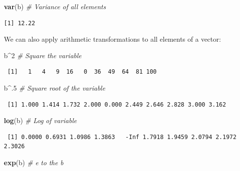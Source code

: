 \documentclass[12pt,]{book}
\newenvironment{Shaded}{\begin{snugshade}}{\end{snugshade}}
\newcommand{\CommentTok}[1]{\textcolor[rgb]{0.56,0.35,0.01}{\textit{#1}}}
\newcommand{\DecValTok}[1]{\textcolor[rgb]{0.00,0.00,0.81}{#1}}
\newcommand{\KeywordTok}[1]{\textcolor[rgb]{0.13,0.29,0.53}{\textbf{#1}}}
\newcommand{\NormalTok}[1]{#1}
\newcommand{\OperatorTok}[1]{\textcolor[rgb]{0.81,0.36,0.00}{\textbf{#1}}}
\begin{document}
\begin{Shaded}
\begin{Highlighting}[]
\KeywordTok{var}\NormalTok{(b)      }\CommentTok{# Variance of all elements}
\end{Highlighting}
\end{Shaded}

\begin{verbatim}
[1] 12.22
\end{verbatim}

We can also apply arithmetic transformations to all elements of a vector:

\begin{Shaded}
\begin{Highlighting}[]
\NormalTok{b}\OperatorTok{^}\DecValTok{2}               \CommentTok{# Square the variable}
\end{Highlighting}
\end{Shaded}

\begin{verbatim}
 [1]   1   4   9  16   0  36  49  64  81 100
\end{verbatim}

\begin{Shaded}
\begin{Highlighting}[]
\NormalTok{b}\OperatorTok{^}\NormalTok{.}\DecValTok{5}              \CommentTok{# Square root of the variable}
\end{Highlighting}
\end{Shaded}

\begin{verbatim}
 [1] 1.000 1.414 1.732 2.000 0.000 2.449 2.646 2.828 3.000 3.162
\end{verbatim}

\begin{Shaded}
\begin{Highlighting}[]
\KeywordTok{log}\NormalTok{(b)            }\CommentTok{# Log of variable}
\end{Highlighting}
\end{Shaded}

\begin{verbatim}
 [1] 0.0000 0.6931 1.0986 1.3863   -Inf 1.7918 1.9459 2.0794 2.1972 2.3026
\end{verbatim}

\begin{Shaded}
\begin{Highlighting}[]
\KeywordTok{exp}\NormalTok{(b)            }\CommentTok{# e to the b}
\end{Highlighting}
\end{Shaded}
\end{document}
